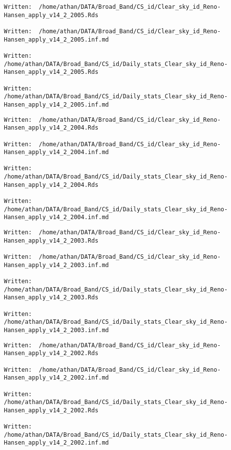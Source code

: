 \documentclass[
  10pt,
  a4paper,oneside]{article}
\begin{document}
\begin{verbatim}
Written:  /home/athan/DATA/Broad_Band/CS_id/Clear_sky_id_Reno-Hansen_apply_v14_2_2005.Rds 

Written:  /home/athan/DATA/Broad_Band/CS_id/Clear_sky_id_Reno-Hansen_apply_v14_2_2005.inf.md 

Written:  /home/athan/DATA/Broad_Band/CS_id/Daily_stats_Clear_sky_id_Reno-Hansen_apply_v14_2_2005.Rds 

Written:  /home/athan/DATA/Broad_Band/CS_id/Daily_stats_Clear_sky_id_Reno-Hansen_apply_v14_2_2005.inf.md 
\end{verbatim}

\begin{verbatim}
Written:  /home/athan/DATA/Broad_Band/CS_id/Clear_sky_id_Reno-Hansen_apply_v14_2_2004.Rds 

Written:  /home/athan/DATA/Broad_Band/CS_id/Clear_sky_id_Reno-Hansen_apply_v14_2_2004.inf.md 

Written:  /home/athan/DATA/Broad_Band/CS_id/Daily_stats_Clear_sky_id_Reno-Hansen_apply_v14_2_2004.Rds 

Written:  /home/athan/DATA/Broad_Band/CS_id/Daily_stats_Clear_sky_id_Reno-Hansen_apply_v14_2_2004.inf.md 
\end{verbatim}

\begin{verbatim}
Written:  /home/athan/DATA/Broad_Band/CS_id/Clear_sky_id_Reno-Hansen_apply_v14_2_2003.Rds 

Written:  /home/athan/DATA/Broad_Band/CS_id/Clear_sky_id_Reno-Hansen_apply_v14_2_2003.inf.md 

Written:  /home/athan/DATA/Broad_Band/CS_id/Daily_stats_Clear_sky_id_Reno-Hansen_apply_v14_2_2003.Rds 

Written:  /home/athan/DATA/Broad_Band/CS_id/Daily_stats_Clear_sky_id_Reno-Hansen_apply_v14_2_2003.inf.md 
\end{verbatim}

\begin{verbatim}
Written:  /home/athan/DATA/Broad_Band/CS_id/Clear_sky_id_Reno-Hansen_apply_v14_2_2002.Rds 

Written:  /home/athan/DATA/Broad_Band/CS_id/Clear_sky_id_Reno-Hansen_apply_v14_2_2002.inf.md 

Written:  /home/athan/DATA/Broad_Band/CS_id/Daily_stats_Clear_sky_id_Reno-Hansen_apply_v14_2_2002.Rds 

Written:  /home/athan/DATA/Broad_Band/CS_id/Daily_stats_Clear_sky_id_Reno-Hansen_apply_v14_2_2002.inf.md 
\end{verbatim}
\end{document}

